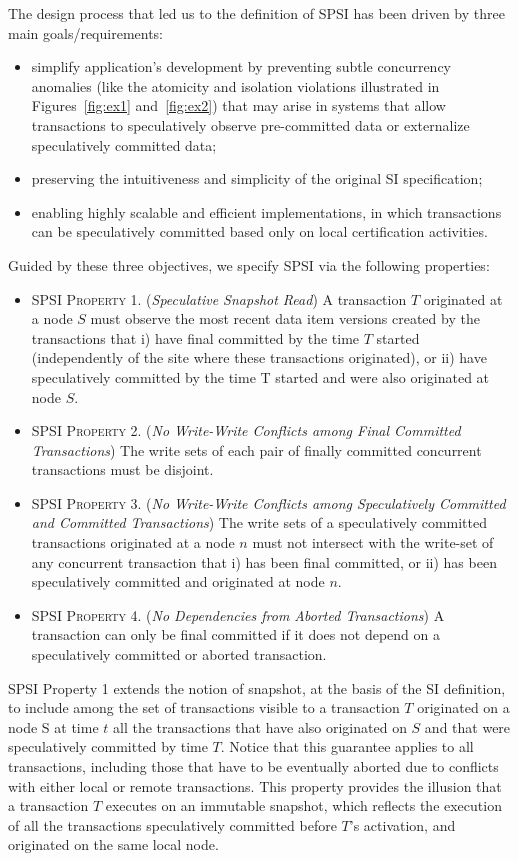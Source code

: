 The design process that led us to the definition of SPSI has been driven by three main goals/requirements:
\begin{itemize}
\item simplify application's development by preventing subtle concurrency anomalies (like the atomicity and isolation violations illustrated in Figures~\ref{fig:ex1} and~\ref{fig:ex2}) that may arise in systems that allow transactions to speculatively observe pre-committed data or externalize speculatively committed data;
\item preserving the intuitiveness and simplicity of the original SI specification;
\item enabling highly scalable and efficient implementations, in which transactions can be speculatively committed based only on local certification activities.
\end{itemize}


Guided by these three objectives, we specify SPSI via the following properties:
\begin{itemize}
\item \textsc{SPSI Property 1.} (\textit{Speculative Snapshot Read}) A transaction $T$ originated at a node $S$ must observe the most recent data item versions created by the transactions that i) have final committed by the time $T$ started (independently of the site where these transactions originated), or ii) have speculatively committed by the time T started and were also originated at node $S$.
\item \textsc{SPSI Property 2.} (\textit{No Write-Write Conflicts among Final Committed Transactions}) The write sets of
each pair of finally committed concurrent transactions must be disjoint.
\item \textsc{SPSI Property 3.} (\textit{No Write-Write Conflicts among Speculatively Committed and Committed Transactions}) The write sets of a speculatively committed transactions originated at a node $n$ must not intersect with the write-set of any concurrent transaction that i) has been final committed, or ii) has been speculatively committed and originated at node $n$.
\item \textsc{SPSI Property 4.} (\textit{No Dependencies from Aborted Transactions}) A transaction can only be final committed if it does not depend on a speculatively committed or aborted transaction.
\end{itemize}

SPSI Property 1 extends the notion of snapshot, at the basis of the SI definition, to include among the set of  transactions visible to a transaction $T$ originated on a node S at time $t$ all the transactions that have also originated on $S$ and that were speculatively committed by time $T$. Notice that this guarantee applies to all transactions, including those that have to be eventually aborted due to conflicts with either local or remote transactions. This property provides the illusion that a transaction $T$ executes on an immutable snapshot, which reflects the execution of all the transactions speculatively committed before $T$'s activation, and originated on the same local node. 

